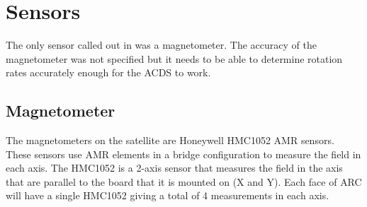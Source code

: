 

\section{Sensors}

The only sensor called out in \cite{Mentch11} was a magnetometer. The accuracy of the magnetometer was not specified but it needs to be able to determine rotation rates accurately enough for the \ac{ACDS} to work.

\subsection{Magnetometer}

The magnetometers on the satellite are Honeywell HMC1052 \ac{AMR} sensors. These sensors use \ac{AMR} elements in a bridge configuration to measure the field in each axis. The HMC1052 is a 2-axis sensor that measures the field in the axis that are parallel to the board that it is mounted on (X and Y). Each face of \ac{ARC} will have a single HMC1052 giving a total of 4 measurements in each axis.

